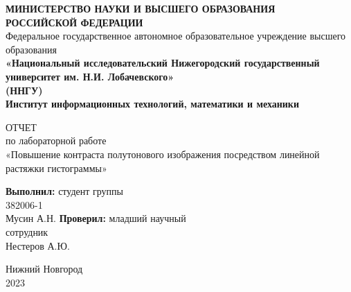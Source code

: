 \documentclass[14pt, russian]{extarticle}
\title{}
\author{}
\date{}
\begin{document}
	\begin{titlepage}
		\begin{center}
			{\bfseries МИНИСТЕРСТВО НАУКИ И ВЫСШЕГО ОБРАЗОВАНИЯ \\
				РОССИЙСКОЙ ФЕДЕРАЦИИ}
			\\
			Федеральное государственное автономное образовательное учреждение высшего образования
			\\
			{\bfseries «Национальный исследовательский Нижегородский государственный университет им. Н.И. Лобачевского»\\(ННГУ)
				\\Институт информационных технологий, математики и механики} \\
		\end{center}
		
		\vspace{8em}
		
		\begin{center}
			ОТЧЕТ \\ по лабораторной работе \\
			«Повышение контраста полутонового изображения посредством линейной растяжки гистограммы»
		\end{center}
		
		\vspace{5em}
		
		
		\begin{flushright}
			{\bfseries Выполнил:} студент группы\\382006-1\\Мусин А.Н. \underline{\hspace{3cm}} \linebreak\linebreak\linebreak
			{\bfseries Проверил:} младший научный\\сотрудник\\Нестеров А.Ю. \underline{\hspace{3cm}} 
		\end{flushright}
		
		
		\vspace{\fill}
		
		\begin{center}
			Нижний Новгород\\2023
		\end{center}
		
	\end{titlepage}
	
	\tableofcontents
\thispagestyle{empty}
\newpage
\end{document}
